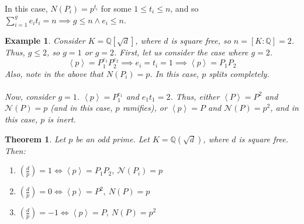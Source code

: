 \documentclass{article}
\newcommand{\la}{\left\langle}
\newcommand{\ra}{\right\rangle}
\newcommand{\Q}{\mathbb{Q}}
\newcommand{\N}{\mathcal{N}}
\newtheorem{theorem}{Theorem}[subsection]
\newtheorem{example}{Example}[subsection]
\begin{document}
In this case, $N(P_i)=p^{t_i}$ for some $1\leq t_i\leq n$, and so $\displaystyle\sum_{i=1}^g e_it_i=n\implies g\leq n\wedge e_i\leq n$.
\begin{example}
Consider $K=\Q[\sqrt{d}]$, where $d$ is square free, so $n=[K:\Q]=2$. Thus, $g\leq 2$, so $g=1$ or $g=2$. First, let us consider the case where $g=2$.
$$\la p\ra =P_1^{e_1}P_2^{e_2}\implies e_i=t_i=1\implies \la p\ra = P_1P_2$$
Also, note in the above that $N(P_i)=p$. In this case, $p$ splits completely.\\
\\
Now, consider $g=1$. $\la p\ra = P_1^{e_1}$ and $e_1t_1=2$. Thus, either $\la P\ra=P^2$ and $\mathcal{N}(P)=p$ (and in this case, $p$ ramifies), or $\la p\ra = P$ and $\mathcal{N}(P)=p^2$, and in this case, $p$ is inert.
\end{example}
\begin{theorem}
Let $p$ be an odd prime. Let $K=\Q(\sqrt{d})$, where $d$ is square free. Then:
\begin{enumerate}[1)]
    \item $\left(\frac{d}{p}\right)=1\iff \la p\ra = P_1P_2,\ \N(P_i)=p$\qquad {}
    \item $\left(\frac{d}{p}\right)=0\iff \la p\ra = P^2,\ N(P)=p$\qquad {}
    \item $\left(\frac{d}{p}\right)=-1\iff \la p\ra = P,\ N(P)=p^2$\qquad {}
\end{enumerate}
\end{theorem}
\end{document}
